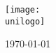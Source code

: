 \begin{titlepage}
    \centering %
    
    \vspace*{1cm}
    \texttt{[image: \\unilogo]}
    
    \vfill 
    
    {\LARGE\bfseries \thetitle \par}
    
    \vspace{1.5cm} 

    {\large \theauthor \par}
    
    \vspace{1cm} 
    
    {\normalsize \today \par}
    
    \vfill 
    
    {\small
    \uniname \\
    }
    \vspace*{1cm}

\end{titlepage}
